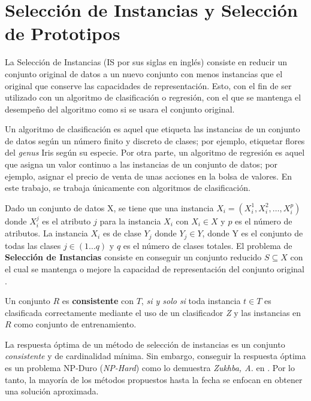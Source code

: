\section{Selección de Instancias y Selección de Prototipos}

La Selección de Instancias \cite{garcia2016data} (IS por sus siglas en inglés) consiste en reducir un conjunto original de datos a un nuevo conjunto con menos instancias que el original que conserve las capacidades de representación. Esto, con el fin de ser utilizado con un algoritmo de clasificación o regresión, con el que se mantenga el desempeño del algoritmo como si se usara el conjunto original.

Un algoritmo de clasificación \cite{hand2007principles} es aquel que etiqueta las instancias de un conjunto de datos según un número finito y discreto de clases; por ejemplo, etiquetar flores del \emph{genus} Iris según su especie. Por otra parte, un algoritmo de regresión \cite{hand2007principles} es aquel que asigna un valor continuo a las instancias de un conjunto de datos; por ejemplo, asignar el precio de venta de unas acciones en la bolsa de valores. En este trabajo, se trabaja únicamente con algoritmos de clasificación. \\

\begin{definicion}
Dado un conjunto de datos X, se tiene que una instancia $X_i = (X_i^1,X_i^2,\dots,X_i^p)$ donde $X_i^j$ es el atributo $j$ para la instancia $X_i$ con $X_i\in X$ y $p$ es el número de atributos. La instancia $X_i$ es de clase $Y_j$ donde $Y_j\in Y$, donde Y es el conjunto de todas las clases $j\in (1\dots q)$ y $q$ es el número de clases totales. El problema de \textbf{Selección de Instancias} consiste en conseguir un conjunto reducido $S\subseteq X$ con el cual se mantenga o mejore la capacidad de representación del conjunto original \cite{garcia2016data}.\\
\end{definicion}


\begin{definicion}
Un conjunto $R$ es \textbf{consistente} con $T$, \emph{si y solo si} toda instancia $t \in T$ es clasificada correctamente mediante el uso de un clasificador \emph{Z} y las instancias en $R$ como conjunto de entrenamiento. \cite{flores2014metaheuristics}
\end{definicion}

La respuesta óptima de un método de selección de instancias es un conjunto \emph{consistente} y de cardinalidad mínima. Sin embargo, conseguir la respuesta óptima es un problema NP-Duro (\emph{NP-Hard}) como lo demuestra \emph{Zukhba, A.} en \cite{zukhba2010np}. Por lo tanto, la mayoría de los métodos propuestos hasta la fecha se enfocan en obtener una solución aproximada.

